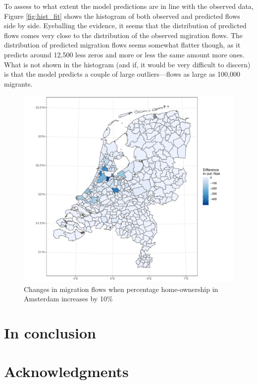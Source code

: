 \documentclass[fleqn,10pt]{SelfArx} %
\begin{document}
{{To assess to what extent the model predictions are in line with the
observed data, Figure \ref{fig:hist_fit} shows the histogram of both
observed and predicted flows side by side. Eyeballing the evidence, it
seems that the distribution of predicted flows comes very close to the
distribution of the observed mgiration flows. The distribution of
predicted migration flows seems somewhat flatter though, as it
predicts around 12,500 less zeros and more or less the same amount
more ones. What is not shown in the histogram (and if, it would be
very difficult to discern) is that the model predicts a couple of
large outliers---flows as large as 100,000 migrants.


\begin{figure}[h!]
  \centering \includegraphics[width =
  \columnwidth]{../fig/p_diff_out.pdf}
  \caption{Changes in migration flows when percentage home-ownership
    in Amsterdam increases by 10\%}\label{fig:diff_out}
\end{figure}

\section{In conclusion}

\section*{Acknowledgments} %

}}
\end{document}
